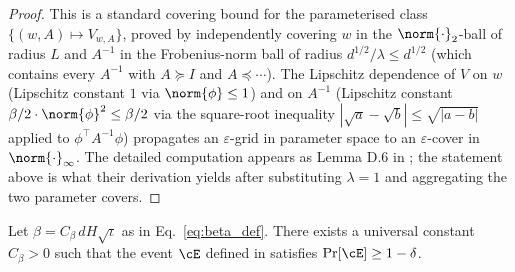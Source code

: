\begin{proof}
This is a standard covering bound for the parameterised class $\{(w, A) \mapsto V_{w, A}\}$, proved by independently covering $w$ in the $\norm{\cdot}_2$-ball of radius $L$ and $A^{-1}$ in the Frobenius-norm ball of radius $d^{1/2} / \lambda \le d^{1/2}$ (which contains every $A^{-1}$ with $A \succeq I$ and $A \preceq \cdots$). The Lipschitz dependence of $V$ on $w$ (Lipschitz constant $1$ via $\norm{\phi} \le 1$) and on $A^{-1}$ (Lipschitz constant $\beta/2 \cdot \norm{\phi}^2 \le \beta/2$ via the square-root inequality $|\sqrt{a} - \sqrt{b}| \le \sqrt{|a-b|}$ applied to $\phi^\top A^{-1} \phi$) propagates an $\varepsilon$-grid in parameter space to an $\varepsilon$-cover in $\norm{\cdot}_\infty$. The detailed computation appears as Lemma D.6 in \cite{jin2020provably}; the statement above is what their derivation yields after substituting $\lambda = 1$ and aggregating the two parameter covers.
\end{proof}

\begin{lemma}\label{lem:concentration}
Let $\beta = C_\beta\, d H \sqrt{\iota}$ as in Eq.~\eqref{eq:beta_def}. There exists a universal constant $C_\beta > 0$ such that the event $\cE$ defined in  satisfies $\Pr[\cE] \ge 1 - \delta$.
\end{lemma}

